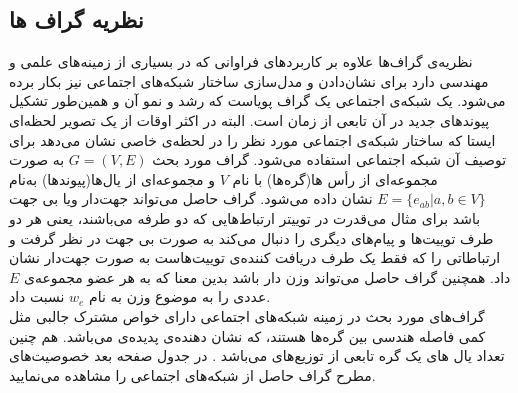 \subsection{نظریه گراف ‌‌ها}
\begin {persian}
 \noindent
 نظریه‌ی گراف‌ها علاوه بر کاربرد‌‌های فراوانی که در بسیاری از زمینه‌های علمی‌ و مهندسی دارد برای نشان‌دادن و مدل‌سازی ساختار شبکه‌های اجتماعی نیز بکار برده می‌شود.‌ یک شبکه‌ی اجتماعی‌ یک گراف پویاست \cite{easley_networks_2010} که رشد و نمو آن و همین‌طور تشکیل پیوندهای جدید در آن تابعی از زمان است. البته در اکثر اوقات از‌ یک تصویر لحظه‌ای \cite{guille_information_2013} ایستا که ساختار شبکه‌ی اجتماعی مورد نظر را در لحظه‌ی خاصی نشان می‌دهد برای توصیف آن شبکه‌‌‌ اجتماعی استفاده می‌شود. گراف مورد بحث $G=(V,E)$ به صورت مجموعه‌ای از رأس ‌‌ها(گره‌ها) با نام $V$ و مجموعه‌ای از‌ یال‌ها(پیوندها) به‌نام $E=\{ e_{ab}| a,b \in V\}$ نشان داده می‌شود. گراف حاصل می‌تواند جهت‌دار و‌یا بی جهت باشد برای مثال می‌قدرت در توییتر ارتباط‌هایی که دو طرفه می‌باشند، ‌یعنی هر دو طرف توییت‌‌ها و پیام‌های دیگری را دنبال می‌کند به صورت بی جهت در نظر گرفت و ارتباطاتی را که فقط‌ یک طرف دریافت کننده‌ی توییت‌هاست به صورت جهت‌دار نشان داد. همچنین گراف حاصل می‌تواند وزن دار باشد بدین معنا که به هر عضو مجموعه‌ی $E$ عددی را به موضوع وزن به نام $w_
e$ نسبت 
داد. \\
 \indent 
گراف‌های مورد بحث در زمینه شبکه‌‌‌های اجتماعی 
دارای خواص مشترک جالبی مثل کمی‌ فاصله هندسی بین گره‌ها هستند، \cite{watts_six_2004, boccaletti_complex_2006} که نشان دهنده‌ی پدیده‌ی  می‌باشد. هم چنین تعداد‌ یال ‌‌های‌ یک گره تابعی از توزیع‌‌‌های  می‌باشد \cite{boccaletti_complex_2006}.
در جدول صفحه بعد خصوصیت‌های مطرح گراف حاصل از شبکه‌های اجتماعی را مشاهده می‌نمایید.
\\
\begin{table}[H]
\end{table}
\end{persian}
